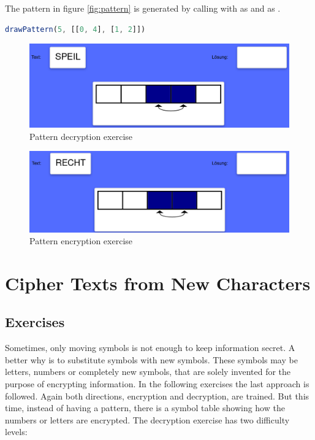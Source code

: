 \begin{example}
  The pattern in figure \ref{fig:pattern} is generated by calling  with  as  and \code{[[0, 4], [1, 2]]} as .
  \begin{lstlisting}[language=TypeScript]
    drawPattern(5, [[0, 4], [1, 2]])
  \end{lstlisting}
\end{example}

\begin{figure} 
    \centering
    \includegraphics[width=1.0 \columnwidth]{figures/pattern_decrypt.png}
    \caption{Pattern decryption exercise} 
    \label{fig:patternDecryption} 
\end{figure}

\begin{figure} 
    \centering
    \includegraphics[width=1.0 \columnwidth]{figures/pattern_encrypt.png}
    \caption{Pattern encryption exercise} 
    \label{fig:patternEncryption} 
\end{figure}

\section{Cipher Texts from New Characters}
\label{section:symbols}

\subsection{Exercises}
Sometimes, only moving symbols is not enough to keep information secret. A better why is to substitute symbols with new symbols. These symbols may be letters, numbers or completely new symbols, that are solely invented for the purpose of encrypting information.
In the following exercises the last approach is followed. Again both directions, encryption and decryption, are trained. But this time, instead of having a pattern, there is a symbol table showing how the numbers or letters are encrypted. The decryption exercise has two difficulty levels:

